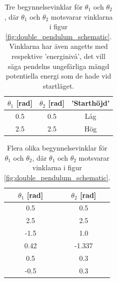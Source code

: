 
\begin{table}[h]
    \centering
    \begin{tabular}{||c|c|c||}
        \hline
        $\theta_1$ [rad] & $\theta_2$ [rad] & 'Starthöjd' \\
        \hline
        0.5 & 0.5 & Låg\\
        2.5 & 2.5 & Hög\\
        \hline
    \end{tabular}
    \caption{Tre begynnelsevinklar för $\theta_1$ och $\theta_2$, där $\theta_1$ och $\theta_2$ motsvarar vinklarna i figur \ref{fig:double_pendulum_schematic}. Vinklarna har även angetts med respektive 'energinivå', det vill säga pendelns ungefärliga mängd potentiella energi som de hade vid startläget.}
    \label{tab:euler_rk4_comparision}
\end{table}
    
\begin{table}[h]
    \centering
    \begin{tabular}{||c|c||}
        \hline
        $\theta_1$ [rad] & $\theta_2$ [rad] \\
        \hline
        0.5 & 0.5 \\
        2.5 & 2.5 \\
        -1.5 & 1.0 \\
        0.42 & -1.337 \\
        0.5 & 0.3 \\
        -0.5 & 0.3 \\
        \hline
    \end{tabular}
    \caption{Flera olika begynnelsevinklar för $\theta_1$ och $\theta_2$, där $\theta_1$ och $\theta_2$ motsvarar vinklarna i figur \ref{fig:double_pendulum_schematic}. }
    \label{tab:angles_for_parametric}
\end{table}